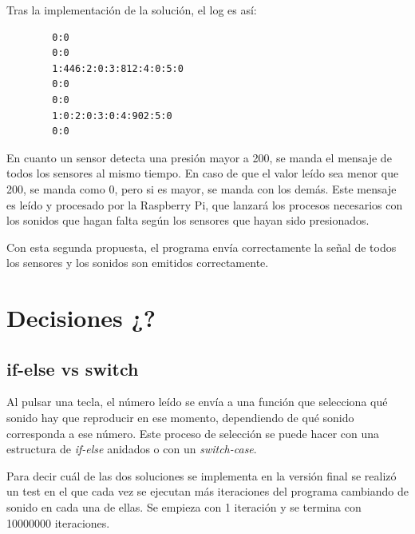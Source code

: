         Tras la implementación de la solución, el log es así:

        \begin{verbatim}
        0:0
        0:0
        1:446:2:0:3:812:4:0:5:0
        0:0
        0:0
        1:0:2:0:3:0:4:902:5:0
        0:0
        \end{verbatim}

        En cuanto un sensor detecta una presión mayor a 200, se manda el mensaje de todos los sensores al mismo tiempo.
        En caso de que el valor leído sea menor que 200, se manda como 0, pero si es mayor, se manda con los demás. Este
        mensaje es leído y procesado por la Raspberry Pi, que lanzará los procesos necesarios con los sonidos que hagan
        falta según los sensores que hayan sido presionados.\newline

        Con esta segunda propuesta, el programa envía correctamente la señal de todos los sensores y los sonidos son
        emitidos correctamente.


    \section{Decisiones ¿?} %
    \label{sec:Decisiones}

        \subsection{if-else vs switch} %
        \label{sub:if-else_vs_switch}

            Al pulsar una tecla, el número leído se envía a una función que selecciona qué sonido hay que reproducir en
            ese momento, dependiendo de qué sonido corresponda a ese número. Este proceso de selección se puede hacer
            con una estructura de \textit{if-else} anidados o con un \textit{switch-case}.\newline

            Para decir cuál de las dos soluciones se implementa en la versión final se realizó un test en el que cada
            vez se ejecutan más iteraciones del programa cambiando de sonido en cada una de ellas. Se empieza con 1
            iteración y se termina con 10000000 iteraciones.\newline

